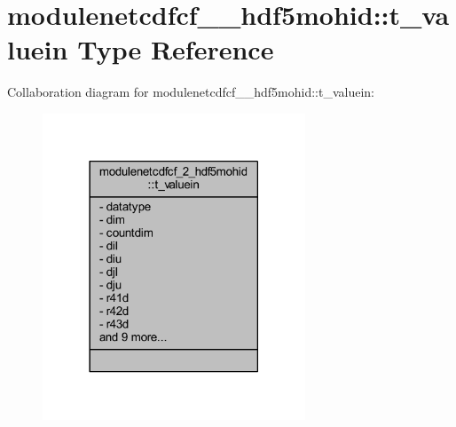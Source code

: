 \hypertarget{structmodulenetcdfcf__2__hdf5mohid_1_1t__valuein}{}\section{modulenetcdfcf\+\_\+\_\+hdf5mohid\+:\+:t\+\_\+valuein Type Reference}
\label{structmodulenetcdfcf__2__hdf5mohid_1_1t__valuein}


Collaboration diagram for modulenetcdfcf\+\_\+\_\+hdf5mohid\+:\+:t\+\_\+valuein\+:\nopagebreak
\begin{figure}[H]
\begin{center}
\leavevmode
\includegraphics[width=222pt]{structmodulenetcdfcf__2__hdf5mohid_1_1t__valuein__coll__graph}
\end{center}
\end{figure}
